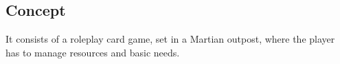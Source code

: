 \subsection{Concept}
\indent 

It consists of a roleplay card game, set in a Martian outpost, where the player has to manage resources and basic needs.  

